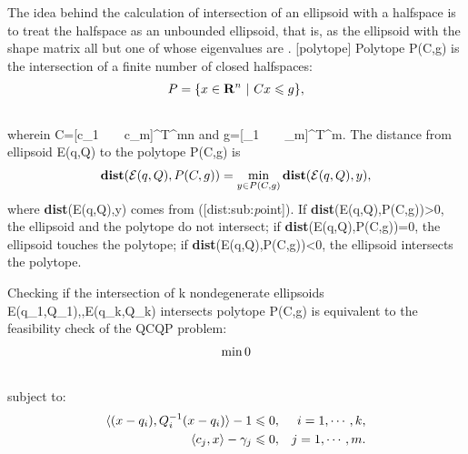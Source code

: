 \documentclass[letterpaper,10pt,english]{sphinxmanual}
\begin{document}
The idea behind the calculation of intersection of an ellipsoid with a
halfspace is to treat the halfspace as an unbounded ellipsoid, that is,
as the ellipsoid with the shape matrix all but one of whose eigenvalues
are \infty. {[}polytope{]} Polytope P(C,g) is the
intersection of a finite number of closed halfspaces:
\begin{gather}
\begin{split}P = \{x\in{\bf R}^n ~|~ Cx\leqslant g\},\end{split}\notag\\\begin{split}\end{split}\notag
\end{gather}
wherein C=[c_1 ~ \cdots ~ c_m]^T^{m\times n} and
g=[\gamma_1 ~ \cdots ~ \gamma_m]^T^m. The distance
from ellipsoid {\mathcal E}(q,Q) to the polytope P(C,g)
is
\begin{gather}
\begin{split}{\bf dist}({\mathcal E}(q,Q),P(C,g))=\min_{y\in P(C,g)}{\bf dist}({\mathcal E}(q,Q),y),
\label{dist_poly}\end{split}\notag
\end{gather}
where {\bf dist}({\mathcal E}(q,Q),y) comes from
({[}dist:sub:\emph{p}oint{]}). If
{\bf dist}({\mathcal E}(q,Q),P(C,g))>0, the ellipsoid and the
polytope do not intersect; if
{\bf dist}({\mathcal E}(q,Q),P(C,g))=0, the ellipsoid touches
the polytope; if {\bf dist}({\mathcal E}(q,Q),P(C,g))<0, the
ellipsoid intersects the polytope.

Checking if the intersection of k nondegenerate ellipsoids
E(q_1,Q_1),\cdots,{\mathcal E}(q_k,Q_k) intersects polytope
P(C,g) is equivalent to the feasibility check of the QCQP
problem:
\begin{gather}
\begin{split}\min 0\end{split}\notag\\\begin{split}\end{split}\notag
\end{gather}
subject to:
\begin{gather}
\begin{split}\begin{aligned}
\langle (x-q_i),Q_i^{-1}(x-q_i)\rangle - 1 \leqslant0, & & i=1,\cdots,k,\\
\langle c_j, x\rangle - \gamma_j \leqslant0, & & j=1,\cdots,m.\end{aligned}\end{split}\notag
\end{gather}
\end{document}

